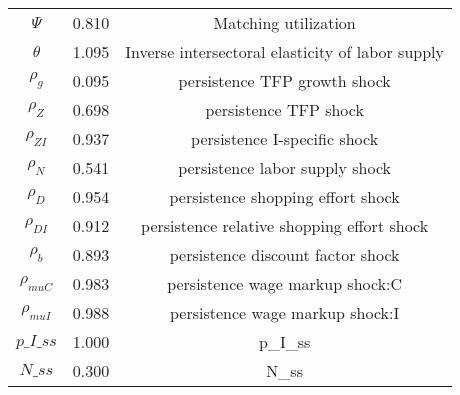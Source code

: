 \begin{center}
\begin{longtable}{ccc}
${\Psi}$ 	 & 	 0.810 	 & 	 Matching utilization\\
${\theta}$ 	 & 	 1.095 	 & 	 Inverse intersectoral elasticity of labor supply\\
${\rho_g}$ 	 & 	 0.095 	 & 	 persistence TFP growth shock\\
${\rho_Z}$ 	 & 	 0.698 	 & 	 persistence TFP shock\\
${\rho_{ZI}}$ 	 & 	 0.937 	 & 	 persistence I-specific shock\\
${\rho_N}$ 	 & 	 0.541 	 & 	 persistence labor supply shock\\
${\rho_D}$ 	 & 	 0.954 	 & 	 persistence shopping effort shock\\
${\rho_{DI}}$ 	 & 	 0.912 	 & 	 persistence relative shopping effort shock\\
${\rho_b}$ 	 & 	 0.893 	 & 	 persistence discount factor shock\\
${\rho_{muC}}$ 	 & 	 0.983 	 & 	 persistence wage markup shock:C\\
${\rho_{muI}}$ 	 & 	 0.988 	 & 	 persistence wage markup shock:I\\
$p\_I\_ss$ 	 & 	 1.000 	 & 	 p\_I\_ss\\
$N\_ss$ 	 & 	 0.300 	 & 	 N\_ss\\
\bottomrule%
\end{longtable}
\end{center}
